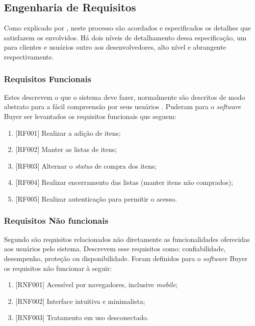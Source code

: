 \documentclass[
	12pt,
	openright,
	oneside, %
	a4paper,
	chapter=TITLE,
	section=TITLE,
	english,
	brazil %
	]{abntex2-udesc}
\begin{document}
\subsection{Engenharia de Requisitos}

Como explicado por , neste processo são acordados e especificados os detalhes que satisfazem os envolvidos. Há dois níveis de detalhamento dessa especificação, um para clientes e usuários outro aos desenvolvedores, alto nível e abrangente respectivamente.

\subsubsection{Requisitos Funcionais}

Estes descrevem o que o sistema deve fazer, normalmente são descritos de modo abstrato para a fácil compreensão por seus usuários \cite{sommerville2011}. Puderam para o \textit{software} Buyer ser levantados os requisitos funcionais que seguem:
\begin{enumerate}
\item $[$RF001$]$ Realizar a adição de itens;
\item $[$RF002$]$ Manter as listas de itens;
\item $[$RF003$]$ Alternar o \textit{status} de compra dos itens;
\item $[$RF004$]$ Realizar encerramento das listas (manter itens não comprados);
\item $[$RF005$]$ Realizar autenticação para permitir o acesso.
\end{enumerate}

\subsubsection{Requisitos Não funcionais}


Segundo  são requisitos relacionados não diretamente as funcionalidades oferecidas aos usuários pelo sistema. Descrevem esse requisitos como: confiabilidade, desempenho, proteção ou disponibilidade.
Foram definidos para o \textit{software} Buyer os requisitos não funcionar à seguir:
\begin{enumerate}
\item $[$RNF001$]$ Acessível por navegadores, inclusive \textit{mobile};
\item $[$RNF002$]$ Interface intuitiva e minimalista;
\item $[$RNF003$]$ Tratamento em uso desconectado.
\end{enumerate}
\end{document}
